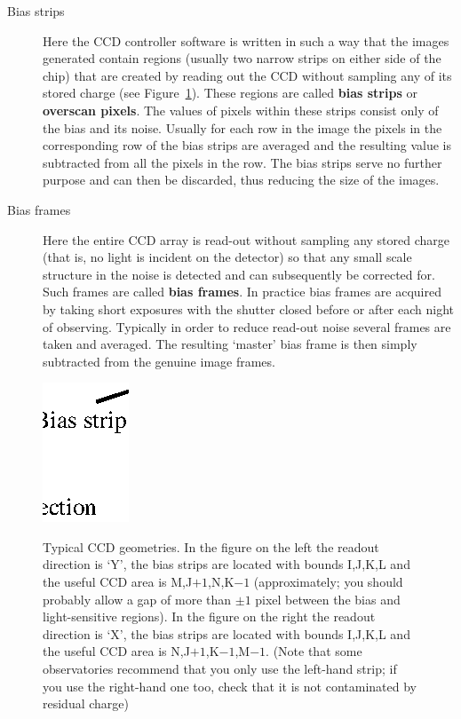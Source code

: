 \documentclass[twoside,11pt]{article}
\begin{document}
\begin{description}

  \item[Bias strips] Here the CCD controller software is written in such
   a way that the images generated contain regions (usually two narrow
   strips on either side of the chip) that are created by reading out the
   CCD without sampling any of its stored charge (see
   Figure~\ref{BIAS_STRIPS}). These regions are called {\bf bias strips}
   or {\bf overscan pixels}.  The values of pixels within these strips
   consist only of the bias and its noise.  Usually for each row in the
   image the pixels in the corresponding row of the bias strips are
   averaged and the resulting value is subtracted from all the pixels in
   the row.  The bias strips serve no further purpose and can then be
   discarded, thus reducing the size of the images.

  \item[Bias frames] Here the entire CCD array is read-out without sampling
   any stored charge (that is, no light is incident on the detector) so
   that any small scale structure in the noise is detected and can
   subsequently be corrected for.  Such frames are called {\bf bias frames}.  
   In practice bias frames are acquired by taking short exposures with
   the shutter closed before or after each night of observing.  Typically
   in order to reduce read-out noise several frames are taken and averaged.
   The resulting `master' bias frame is then simply subtracted from the
   genuine image frames.

\end{description}

\begin{figure}[htbp]
   \centering 
   \includegraphics[totalheight=3.5in]{sc5_biasstrips.ps}
   \begin{quote}
   \caption[Typical CCD geometries]{Typical CCD geometries.
    In the figure on the left the readout direction is `Y', the bias
    strips are located with bounds I,J,K,L and the useful CCD area is
    M,J$+1$,N,K$-1$ (approximately; you should probably allow a gap of
    more than $\pm 1$ pixel between the bias and light-sensitive regions).
    In the figure on the right the readout direction is `X', the bias
    strips are located with bounds I,J,K,L and the useful CCD area is
    N,J$+1$,K$-1$,M$-1$. (Note that some observatories recommend that you
    only use the left-hand strip; if you use the right-hand one too, check
    that it is not contaminated by residual charge)
   \label{BIAS_STRIPS} }
   \end{quote}
\end{figure}
\end{document}
